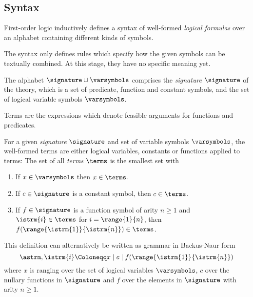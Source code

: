         \subsection{Syntax}
            \label{sec:FOL-syntax}

            First-order logic inductively defines a syntax of well-formed \emph{logical formulas} over an alphabet containing different kinds of symbols.

            The syntax only defines rules which specify how the given symbols can be textually combined. At this stage, they have no specific meaning yet.

            The alphabet $\signature\cup\varsymbols$ comprises the \emph{signature} $\signature$ of the theory, which is a set of predicate, function and constant symbols, and the set of logical variable symbols $\varsymbols$.

            Terms are the expressions which denote feasible arguments for functions and predicates.
            \begin{definition}[Terms]
                For a given \emph{signature} $\signature$ and set of variable symbols $\varsymbols$, the well-formed terms are either logical variables, constants or functions applied to terms:
                The set of all \emph{terms} $\terms$ is the smallest set with
                \begin{enumerate}
                    \item If $x\in\varsymbols$ then $x\in\terms$.
                    \item If $c\in\signature$ is a constant symbol, then $c\in\terms$.
                    \item If $f\in\signature$ is a function symbol of arity $n\geq 1$ and $\istrm{i}\in\terms$ for $i=\range{1}{n}$, then $f(\range{\istrm{1}}{\istrm{n}})\in\terms$.
                \end{enumerate}
                This definition can alternatively be written as grammar in Backus-Naur form
                \begin{equation*}
                    \astrm,\istrm{i} \Coloneqq
                        x \mid
                        c \mid
                        f(\range{\istrm{1}}{\istrm{n}})
                \end{equation*}
                where $x$ is ranging over the set of logical variables $\varsymbols$, $c$ over the nullary functions in $\signature$ and $f$ over the elements in $\signature$ with arity $n\geq 1$.
            \end{definition}

